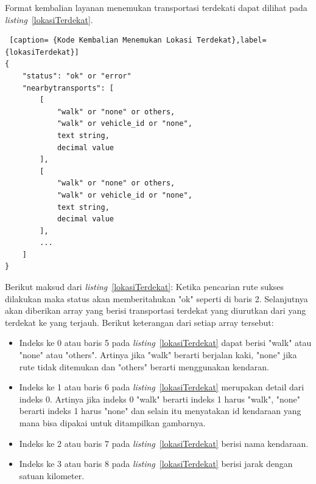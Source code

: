 Format kembalian layanan menemukan transportasi terdekati dapat dilihat pada \textit{listing}~\ref{lokasiTerdekat}.

\begin{lstlisting} [caption= {Kode Kembalian Menemukan Lokasi Terdekat},label={lokasiTerdekat}]
{
    "status": "ok" or "error"
    "nearbytransports": [
        [
            "walk" or "none" or others,
            "walk" or vehicle_id or "none",
            text string,
            decimal value
        ],
        [
            "walk" or "none" or others,
            "walk" or vehicle_id or "none",
            text string,
            decimal value
        ],
        ...     
    ]
}\end{lstlisting}
Berikut maksud dari \textit{listing}~\ref{lokasiTerdekat}: \newline
\hspace{0.5cm} Ketika pencarian rute sukses dilakukan maka status akan memberitahukan "ok" seperti di baris 2. Selanjutnya akan diberikan array yang berisi transportasi terdekat yang diurutkan dari yang terdekat ke yang terjauh. Berikut keterangan dari setiap array tersebut: 
\begin{itemize}
	\item Indeks ke 0 atau baris 5 pada \textit{listing}~\ref{lokasiTerdekat} dapat berisi "walk" atau "none" atau "others". Artinya  jika "walk" berarti berjalan kaki, "none" jika rute tidak ditemukan dan "others" berarti menggunakan kendaran.
	\item Indeks ke 1 atau baris 6 pada \textit{listing}~\ref{lokasiTerdekat} merupakan detail dari indeks 0. Artinya jika indeks 0 "walk" berarti indeks 1 harus "walk", "none" berarti indeks 1 harus "none" dan selain itu menyatakan id kendaraan yang mana bisa dipakai untuk ditampilkan gambarnya.
	\item Indeks ke 2 atau baris 7 pada \textit{listing}~\ref{lokasiTerdekat} berisi nama kendaraan.
	\item Indeks ke 3 atau baris 8 pada \textit{listing}~\ref{lokasiTerdekat} berisi jarak dengan satuan kilometer.
\end{itemize}